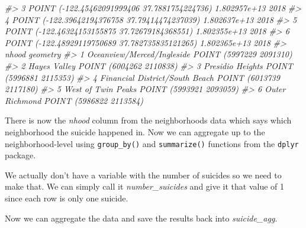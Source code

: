 \documentclass[
]{krantz}
\makeatletter
\newenvironment{Shaded}{\begin{snugshade}}{\end{snugshade}}
\newcommand{\CommentTok}[1]{\textcolor[rgb]{0.37,0.37,0.37}{\textit{#1}}}
\newcommand{\DecValTok}[1]{\textcolor[rgb]{0.06,0.06,0.06}{#1}}
\newcommand{\NormalTok}[1]{#1}
\newcommand{\OtherTok}[1]{\textcolor[rgb]{0.37,0.37,0.37}{#1}}
\newcommand{\SpecialCharTok}[1]{\textcolor[rgb]{0,0,0}{#1}}
\newenvironment{kframe}{%
\medskip{}
\setlength{\fboxsep}{.8em}
 \def\at@end@of@kframe{}%
 \ifinner\ifhmode%
  \def\at@end@of@kframe{\end{minipage}}%
  \begin{minipage}{\columnwidth}%
 \fi\fi%
 \def\FrameCommand##1{\hskip\@totalleftmargin \hskip-\fboxsep
 \colorbox{shadecolor}{##1}\hskip-\fboxsep
     \hskip-\linewidth \hskip-\@totalleftmargin \hskip\columnwidth}%
 \MakeFramed {\advance\hsize-\width
   \@totalleftmargin\z@ \linewidth\hsize
   \@setminipage}}%
 {\par\unskip\endMakeFramed%
 \at@end@of@kframe}
\renewenvironment{Shaded}{\begin{kframe}}{\end{kframe}}
\makeatother
\begin{document}
\begin{Shaded}
\begin{Highlighting}[]
\CommentTok{\#\textgreater{} 3   POINT ({-}122.45462091999406 37.7881754224736) 1.802957e+13 2018}
\CommentTok{\#\textgreater{} 4  POINT ({-}122.39642194376758 37.79414474237039) 1.802637e+13 2018}
\CommentTok{\#\textgreater{} 5  POINT ({-}122.46324153155875 37.72679184368551) 1.802355e+13 2018}
\CommentTok{\#\textgreater{} 6 POINT ({-}122.48929119750689 37.782735835121265) 1.802365e+13 2018}
\CommentTok{\#\textgreater{}                            nhood                geometry}
\CommentTok{\#\textgreater{} 1     Oceanview/Merced/Ingleside POINT (5997229 2091310)}
\CommentTok{\#\textgreater{} 2                   Hayes Valley POINT (6004262 2110838)}
\CommentTok{\#\textgreater{} 3               Presidio Heights POINT (5996881 2115353)}
\CommentTok{\#\textgreater{} 4 Financial District/South Beach POINT (6013739 2117180)}
\CommentTok{\#\textgreater{} 5             West of Twin Peaks POINT (5993921 2093059)}
\CommentTok{\#\textgreater{} 6                 Outer Richmond POINT (5986822 2113584)}
\end{Highlighting}
\end{Shaded}

There is now the \emph{nhood} column from the neighborhoods data which says which neighborhood the suicide happened in. Now we can aggregate up to the neighborhood-level using \texttt{group\_by()} and \texttt{summarize()} functions from the \texttt{dplyr} package.

We actually don't have a variable with the number of suicides so we need to make that. We can simply call it \emph{number\_suicides} and give it that value of 1 since each row is only one suicide.

\begin{Shaded}
\end{Shaded}

Now we can aggregate the data and save the results back into \emph{suicide\_agg}.
\end{document}
